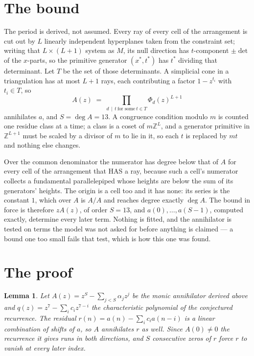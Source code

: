 \documentclass[11pt,a4paper]{article}
\theoremstyle{plain}
\newtheorem{lemma}[theorem]{Lemma}
\theoremstyle{definition}
\begin{document}
\section{The bound}

The period is derived, not assumed. Every ray of every cell of the arrangement is cut out by
$L$ linearly independent hyperplanes taken from the constraint set; writing that $L\times(L+1)$
system as $M$, its null direction has $t$-component $\pm\det$ of the $x$-parts, so the
primitive generator $(x^*,t^*)$ has $t^*$ dividing that determinant. Let $T$ be the set of
those determinants. A simplicial cone in a triangulation has at most $L+1$ rays, each
contributing a factor $1-z^{t_i}$ with $t_i\in T$, so
\[
A(z)\;=\;\prod_{d\,\mid\,t\ \text{for some}\ t\in T}\Phi_d(z)^{L+1}
\]
annihilates $a$, and $S=\deg A=13$. A congruence condition modulo $m$ is counted one residue
class at a time; a class is a coset of $m\mathbb{Z}^L$, and a generator primitive in
$\mathbb{Z}^{L+1}$ must be scaled by a divisor of $m$ to lie in it, so each $t$ is replaced
by $mt$ and nothing else changes.

Over the common denominator the numerator has degree below that of $A$ for every cell of the
arrangement that HAS a ray, because such a cell's numerator collects a fundamental
parallelepiped whose heights are below the sum of its generators' heights. The origin is a cell
too and it has none: its series is the constant $1$, which over $A$ is $A/A$ and reaches degree
exactly $\deg A$. The bound in force is therefore $zA(z)$, of order $S=13$, and
$a(0),\dots,a(S-1)$, computed exactly, determine every later term. Nothing is fitted, and the
annihilator is tested on terms the model was not asked for before anything is claimed --- a
bound one too small fails that test, which is how this one was found.

\section{The proof}

\begin{lemma}\label{lem:crit}
Let $A(z)=z^S-\sum_{j<S}\alpha_jz^{j}$ be the monic annihilator derived above and
$q(z)=z^{7}-\sum_ic_iz^{7-i}$ the characteristic polynomial of the conjectured
recurrence. The residual $r(n)=a(n)-\sum_ic_ia(n-i)$ is a linear combination of shifts of $a$,
so $A$ annihilates $r$ as well. Since $A(0)\ne0$ the recurrence it gives runs in both
directions, and $S$ consecutive zeros of $r$ force $r$ to vanish at every later index.
\end{lemma}
\end{document}
